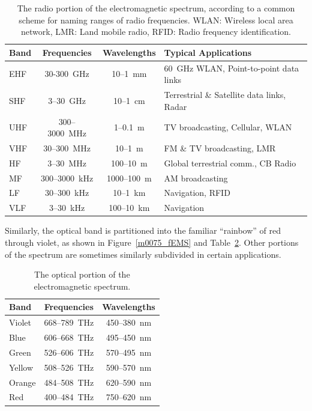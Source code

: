 \begin{table}[t]
\begin{center}
\begin{tabular}{lccl}
Band & Frequencies & Wavelengths & Typical Applications \\
\hline
EHF & 30-300~GHz & 10--1~mm & 60~GHz WLAN, Point-to-point data links \\
SHF & 3--30~GHz & 10--1~cm & Terrestrial \& Satellite data links, Radar \\ 
UHF & 300--3000~MHz & 1--0.1~m & TV broadcasting, Cellular, WLAN \\
VHF & 30--300~MHz & 10--1~m & FM \& TV broadcasting, LMR \\ 
HF & 3--30~MHz & 100--10~m & Global terrestrial comm., CB Radio \\
MF & 300--3000~kHz & 1000--100~m & AM broadcasting \\
LF & 30--300~kHz & 10--1~km & Navigation, RFID \\
VLF & 3--30~kHz & 100--10~km & Navigation \\
\end{tabular}
\end{center}
\caption{The radio portion of the electromagnetic spectrum, according to a common scheme for naming ranges of radio frequencies. WLAN: Wireless local area network, LMR: Land mobile radio, RFID: Radio frequency identification.}
\label{m0075_tRFS}
\end{table}

Similarly, the optical band is partitioned into the familiar ``rainbow'' of red through violet, as shown in Figure~\ref{m0075_fEMS} and Table~\ref{m0075_tOptical}. Other portions of the spectrum are sometimes similarly subdivided in certain applications.
%
\begin{table}
\begin{center}
\begin{tabular}{lcc}
Band & Frequencies & Wavelengths \\
\hline
Violet & 668--789~THz & 450--380~nm  \\
Blue   & 606--668~THz & 495--450~nm  \\
Green  & 526--606~THz & 570--495~nm  \\ 
Yellow & 508--526~THz & 590--570~nm  \\
Orange & 484--508~THz & 620--590~nm  \\
Red    & 400--484~THz & 750--620~nm  \\
\end{tabular}
\end{center}
\caption{The optical portion of the electromagnetic spectrum.}
\label{m0075_tOptical}
\end{table}

